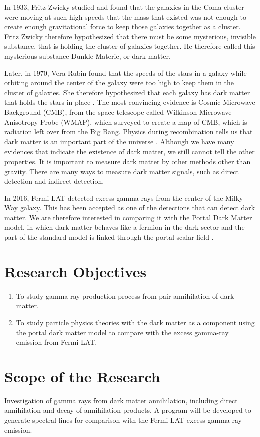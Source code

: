 \documentclass[10pt, oneside]{book}
\numberwithin{equation}{chapter}
\begin{document}
In 1933, Fritz Zwicky studied and found that the galaxies in the Coma cluster were moving at such high speeds that the mass that existed was not enough to create enough gravitational force to keep those galaxies together as a cluster. Fritz Zwicky therefore hypothesized that there must be some mysterious, invisible substance, that is holding the cluster of galaxies together. He therefore called this mysterious substance Dunkle Materie, or dark matter.

Later, in 1970, Vera Rubin found that the speeds of the stars in a galaxy while orbiting around the center of the galaxy were too high to keep them in the cluster of galaxies. She therefore hypothesized that each galaxy has dark matter that holds the stars in place \cite{Bertone_2018}. The most convincing evidence is Cosmic Microwave Background (CMB), from the space telescope called Wilkinson Microwave Anisotropy Probe (WMAP), which surveyed to create a map of CMB, which is radiation left over from the Big Bang. Physics during recombination tells us that dark matter is an important part of the universe \cite{Bertone_2005}. Although we have many evidences that indicate the existence of dark matter, we still cannot tell the other properties. It is important to measure dark matter by other methods other than gravity. There are many ways to measure dark matter signals, such as direct detection and indirect detection.

In 2016, Fermi-LAT detected excess gamma rays from the center of the Milky Way galaxy. This has been accepted as one of the detections that can detect dark matter. We are therefore interested in comparing it with the Portal Dark Matter model, in which dark matter behaves like a fermion in the dark sector and the part of the standard model is linked through the portal scalar field \cite{Ackermann_2017}.

\section{Research Objectives}
\begin{enumerate}
	\item  To study gamma-ray production process from pair annihilation of dark matter.
	\item To study particle physics theories with the dark matter as a component using the portal dark matter model to compare with the excess gamma-ray emission from Fermi-LAT.
\end{enumerate}

\section{Scope of the Research}
Investigation of gamma rays from dark matter annihilation, including direct annihilation and decay of annihilation products. A program will be developed to generate spectral lines for comparison with the Fermi-LAT excess gamma-ray emission.
\end{document}
